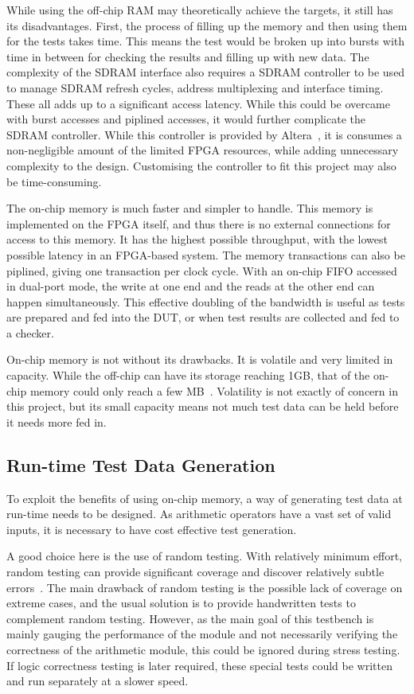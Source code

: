 While using the off-chip RAM may theoretically achieve the targets,
it still has its disadvantages.
First, the process of filling up the memory and then using them for the tests
takes time.
This means the test would be broken up into bursts with time in between for
checking the results and filling up with new data.
The complexity of the SDRAM interface also requires a SDRAM controller to be
used to manage SDRAM refresh cycles, address multiplexing and interface timing.
These all adds up to a significant access latency.
While this could be overcame with burst accesses and piplined accesses,
it would further complicate the SDRAM controller.
While this controller is provided by Altera~\cite{Altera3}, it is consumes
a non-negligible amount of the limited FPGA resources, while adding
unnecessary complexity to the design.
Customising the controller to fit this project may also be time-consuming.

The on-chip memory is much faster and simpler to handle.
This memory is implemented on the FPGA itself, and thus there is no external
connections for access to this memory.
It has the highest possible throughput, with the lowest possible latency
in an FPGA-based system.
The memory transactions can also be piplined, giving one transaction per
clock cycle.
With an on-chip FIFO accessed in dual-port mode, the write at one end and the
reads at the other end can happen simultaneously.
This effective doubling of the bandwidth is useful as tests are prepared
and fed into the DUT, or when test results are collected and fed to a checker.

On-chip memory is not without its drawbacks.
It is volatile and very limited in capacity.
While the off-chip can have its storage reaching 1GB, that of the on-chip
memory could only reach a few MB~\cite{Altera2}.
Volatility is not exactly of concern in this project, but its small capacity
means not much test data can be held before it needs more fed in.

\subsection{Run-time Test Data Generation}
To exploit the benefits of using on-chip memory, a way of generating test data
at run-time needs to be designed.
As arithmetic operators have a vast set of valid inputs, it is necessary to
have cost effective test generation.

A good choice here is the use of random testing.
With relatively minimum effort, random testing can provide significant coverage
and discover relatively subtle errors~\cite{Duran1}.
The main drawback of random testing is the possible lack of coverage on extreme
cases, and the usual solution is to provide handwritten tests to complement
random testing.
However, as the main goal of this testbench is mainly gauging the performance of
the module and not necessarily verifying the correctness of the arithmetic
module, this could be ignored during stress testing.
If logic correctness testing is later required, these special tests could be
written and run separately at a slower speed.

